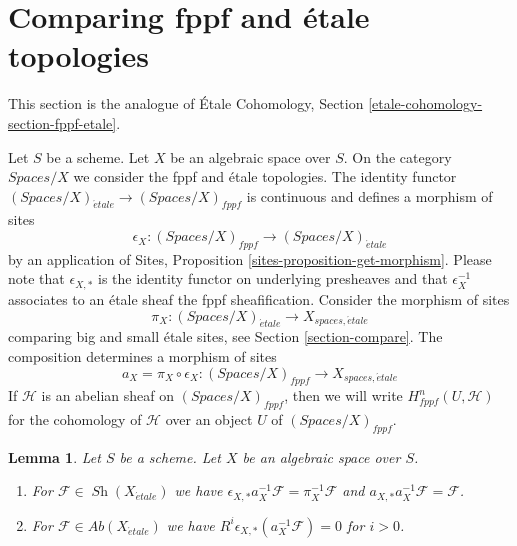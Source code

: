 \documentclass{stacks-project}
\theoremstyle{plain}
\newtheorem{lemma}[subsection]{Lemma}
\theoremstyle{definition}
\theoremstyle{remark}
\numberwithin{equation}{subsection}
\def\Sh{\mathop{\mathit{Sh}}\nolimits}
\def\etale{{\acute{e}tale}}
\begin{document}
\section{Comparing fppf and \'etale topologies}
\label{section-fppf-etale}

\noindent
This section is the analogue of
\'Etale Cohomology, Section \ref{etale-cohomology-section-fppf-etale}.

\medskip\noindent
Let $S$ be a scheme. Let $X$ be an algebraic space over $S$.
On the category $\textit{Spaces}/X$ we consider the fppf
and \'etale topologies. The identity functor
$(\textit{Spaces}/X)_\etale \to (\textit{Spaces}/X)_{fppf}$
is continuous and defines a morphism of sites
$$
\epsilon_X :
(\textit{Spaces}/X)_{fppf} \longrightarrow (\textit{Spaces}/X)_\etale
$$
by an application of Sites, Proposition \ref{sites-proposition-get-morphism}.
Please note that $\epsilon_{X, *}$ is the identity functor on underlying
presheaves and that $\epsilon_X^{-1}$ associates to an \'etale sheaf the
fppf sheafification.
Consider the morphism of sites
$$
\pi_X : (\textit{Spaces}/X)_\etale \longrightarrow X_{spaces, \etale}
$$
comparing big and small \'etale sites, see Section \ref{section-compare}.
The composition determines a morphism of sites
$$
a_X = \pi_X \circ \epsilon_X :
(\textit{Spaces}/X)_{fppf}
\longrightarrow
X_{spaces, \etale}
$$
If $\mathcal{H}$ is an abelian sheaf on $(\textit{Spaces}/X)_{fppf}$,
then we will write $H^n_{fppf}(U, \mathcal{H})$ for the cohomology
of $\mathcal{H}$ over an object $U$ of $(\textit{Spaces}/X)_{fppf}$.

\begin{lemma}
\label{lemma-comparison-fppf-etale}
Let $S$ be a scheme. Let $X$ be an algebraic space over $S$.
\begin{enumerate}
\item For $\mathcal{F} \in \Sh(X_\etale)$ we have
$\epsilon_{X, *}a_X^{-1}\mathcal{F} = \pi_X^{-1}\mathcal{F}$
and $a_{X, *}a_X^{-1}\mathcal{F} = \mathcal{F}$.
\item For $\mathcal{F} \in \textit{Ab}(X_\etale)$ we have
$R^i\epsilon_{X, *}(a_X^{-1}\mathcal{F}) = 0$ for $i > 0$.
\end{enumerate}
\end{lemma}
\end{document}
